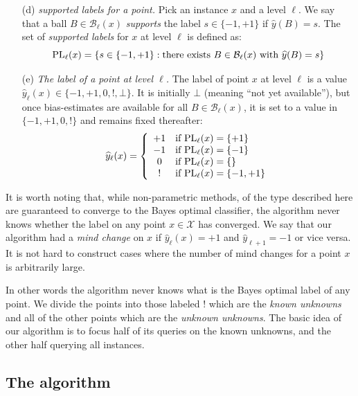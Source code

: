 \documentclass{article}
\def\X{{\mathcal X}}
\def\B{{\mathcal B}}
\def\yh{{\widehat{y}}}
\def\PL{{\mbox{\rm PL}}}
\begin{document}
\begin{enumerate}
\begin{enumerate}
\item[(d)] {\it supported labels for a point.} Pick an instance $x$ and a level $\ell$. We say that a ball $B \in \B_\ell(x)$ {\em supports} the label $s \in \{-1,+1\}$ if $\yh(B) = s$. The set of {\em supported labels} for $x$ at level $\ell$ is defined as:
\begin{equation}
\PL_\ell(x) = \{s \in \{-1, +1\}: \mbox{there exists $B \in \B_\ell(x)$ with $\yh(B) = s$} \} 
\label{eq:PL}
\end{equation}

\item[(e)] {\it The label of a point at level $\ell$.} The label of point $x$ at level $\ell$ is a value $\yh_\ell(x) \in \{-1,+1,0,!,\bot\}$. It is initially $\bot$ (meaning ``not yet available''), but once bias-estimates are available for all $B \in \B_\ell(x)$, it is set to a value in $\{-1,+1,0,!\}$ and remains fixed thereafter:
\begin{equation}
\yh_\ell(x) = 
\left\{
\begin{array}{cl}
+1 & \mbox{if $\PL_\ell(x) = \{+1\}$} \\
-1 &  \mbox{if $\PL_\ell(x) = \{-1\}$} \\
0 & \mbox{if $\PL_\ell(x) = \{\}$} \\
! & \mbox{if $\PL_\ell(x) = \{-1,+1\}$}
\end{array}
\right.
\label{eq:provisional-label}
\end{equation}
\end{enumerate}
\end{enumerate}

It is worth noting that, while non-parametric methods, of the type described here are guaranteed to converge to the Bayes optimal classifier, the algorithm never knows whether the label on any point $x \in \X$ has converged. We say that our algorithm had a {\em mind change} on $x$ if $\yh_\ell(x)=+1$ and $\yh_{\ell+1}=-1$ or vice versa. It is not hard to construct cases where the number of mind changes for a point $x$ is arbitrarily large. 

In other words the algorithm never knows what is the Bayes optimal label of any point. We divide the points into those labeled $!$ which are the {\em known unknowns} and all of the other points which are the {\em unknown unknowns}.
The basic idea of our algorithm is to focus half of its queries on the known unknowns, and the other half  querying all instances.

\subsection{The algorithm}
\end{document}
